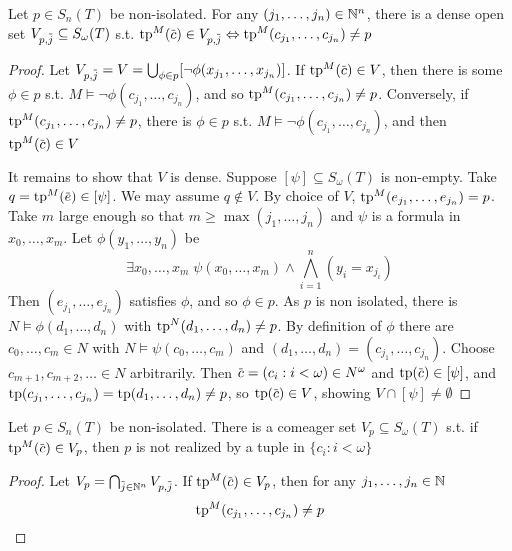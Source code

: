 \documentclass[11pt]{article}
\begin{document}
\begin{lemma}[]
Let \(p\in S_n(T)\) be non-isolated. For any \((j_1,\dots,j_n)\in\mathbb{N}^n\), there is a dense open
set \(V_{p,\barj}\subseteq S_\omega(T)\) s.t. \(\tp^M(\barc)\in V_{p,\barj}\Leftrightarrow\tp^M(c_{j_1},\dots,c_{j_n})\neq p\)
\end{lemma}

\begin{proof}
Let \(V_{p,\barj}=V=\bigcup_{\phi\in p}[\neg\phi(x_{j_1},\dots,x_{j_n})]\). If \(\tp^M(\barc)\in V\), then there is
some \(\phi\in p\) s.t. \(M\vDash\neg\phi(c_{j_1},\dots,c_{j_n})\), and so \(\operatorname{tp}^M(c_{j_1},\dots,c_{j_n})\neq p\). Conversely,
if \(\operatorname{tp}^M(c_{j_1},\dots,c_{j_n})\neq p\), there is \(\phi\in p\) s.t. \(M\vDash\neg\phi(c_{j_1},\dots,c_{j_n})\), and
then \(\tp^M(\barc)\in V\)

It remains to show that \(V\) is dense. Suppose \([\psi]\subseteq S_\omega(T)\) is non-empty.
Take \(q=\tp^M(\bare)\in[\psi]\). We may assume \(q\notin V\). By choice
of \(V\), \(\operatorname{tp}^M(e_{j_1},\dots,e_{j_n})=p\). Take \(m\) large enough so that  \(m\ge\max(j_1,\dots,j_n)\)  and \(\psi\) is a formula
in \(x_0,\dots,x_m\). Let \(\phi(y_1,\dots,y_n)\) be
\begin{equation*}
\exists x_0,\dots,x_m\;\psi(x_0,\dots,x_m)\wedge\bigwedge_{i=1}^n(y_i=x_{j_i})
\end{equation*}
Then \((e_{j_1},\dots,e_{j_n})\) satisfies \(\phi\), and so \(\phi\in p\). As \(p\) is non isolated, there
is \(N\vDash\phi(d_1,\dots,d_n)\) with \(\operatorname{tp}^N(d_1,\dots,d_n)\neq p\). By definition of \(\phi\) there are \(c_0,\dots,c_m\in N\)
with \(N\vDash\psi(c_0,\dots,c_m)\) and \((d_1,\dots,d_n)=(c_{j_1},\dots,c_{j_n})\). Choose \(c_{m+1},c_{m+2},\dots\in N\)
arbitrarily. Then \(\barc=(c_i:i<\omega)\in N^\omega\) and \(\tp(\barc)\in[\psi]\),
and \(\operatorname{tp}(c_{j_1},\dots,c_{j_n})=\operatorname{tp}(d_1,\dots,d_n)\neq p\), so \(\tp(\barc)\in V\), showing \(V\cap[\psi]\neq\emptyset\)
\end{proof}

\begin{proposition}[]
Let \(p\in S_n(T)\) be non-isolated. There is a comeager set \(V_p\subseteq S_\omega(T)\) s.t.
if \(\tp^M(\barc)\in V_p\), then \(p\) is not realized by a tuple in \(\{c_i:i<\omega\}\)
\end{proposition}

\begin{proof}
Let \(V_p=\bigcap_{\barj\in\N^n}V_{p,\barj}\). If \(\tp^M(\barc)\in V_p\), then for any \(j_1,\dots,j_n\in\mathbb{N}\)
\begin{equation*}
\operatorname{tp}^M(c_{j_1},\dots,c_{j_n})\neq p
\end{equation*}
\end{proof}
\end{document}
